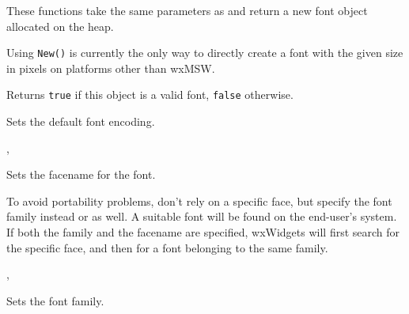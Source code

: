 These functions take the same parameters as  and return a new font object allocated on the heap.

Using \texttt{New()} is currently the only way to directly create a font with
the given size in pixels on platforms other than wxMSW.


\label{wxfontok}


Returns {\tt true} if this object is a valid font, {\tt false} otherwise.


\label{wxfontsetdefaultencoding}


Sets the default font encoding.


, 


\label{wxfontsetfacename}


Sets the facename for the font.




To avoid portability problems, don't rely on a specific face, but specify the font family
instead or as well. A suitable font will be found on the end-user's system. If both the
family and the facename are specified, wxWidgets will first search for the specific face,
and then for a font belonging to the same family.


, 


\label{wxfontsetfamily}


Sets the font family.



